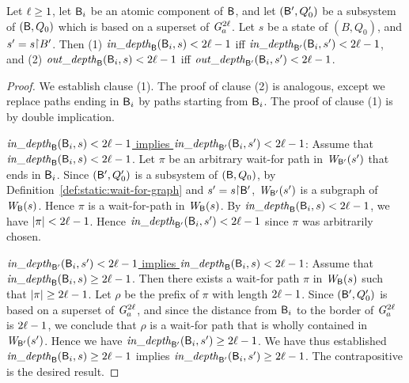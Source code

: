 \begin{proposition} \label{prop:in-out-projection}
Let $\ell \ge 1$, let $\mathsf{B}_i$ be an atomic component of $\mathsf{B}$, and let 
$(\mathsf{B}', Q'_0)$ be a subsystem of $(\mathsf{B}, Q_0)$ which is based on a superset of $\mathit{G}_{a}^{2\ell}$.
Let $s$ be a state of $(B, Q_0)$, and $s' = s \pj B'$. Then
(1) $\mathit{in\_depth}_{\mathsf{B}}({\mathsf{B}_i, s}) < 2\ell-1$ iff $\mathit{in\_depth}_{\mathsf{B}'}({\mathsf{B}_i, s'}) < 2\ell-1$, and
(2) $\mathit{out\_depth}_{\mathsf{B}}({\mathsf{B}_i, s}) < 2\ell-1$ iff $\mathit{out\_depth}_{\mathsf{B}'}({\mathsf{B}_i, s'}) < 2\ell-1$.
\end{proposition}
%
\begin{proof}
We establish clause (1). The proof of clause (2) is analogous, except we replace paths ending in
$\mathsf{B}_i$ by paths starting from $\mathsf{B}_i$.
The proof of clause (1) is by double implication.

\vspace{1.0ex}
\ul{$\mathit{in\_depth}_{\mathsf{B}}({\mathsf{B}_i, s}) < 2\ell-1$ implies $\mathit{in\_depth}_{\mathsf{B}'}({\mathsf{B}_i, s'}) < 2\ell-1$}:
%
Assume that $\mathit{in\_depth}_{\mathsf{B}}({\mathsf{B}_i, s}) < 2\ell-1$.
Let $\pi$ be an arbitrary wait-for path in $\mathit{W}_{\mathsf{B}'}({s'})$ that ends in $\mathsf{B}_i$. 
%
Since $(\mathsf{B}', Q'_0)$ is a subsystem of $(\mathsf{B}, Q_0)$, by Definition~\ref{def:static:wait-for-graph} and $s' = s \pj \B'$,
$\mathit{W}_{\mathsf{B}'}({s'})$ is a subgraph of $\mathit{W}_{\mathsf{B}}({s})$.
%
Hence $\pi$ is a wait-for-path in $\mathit{W}_{\mathsf{B}}({s})$.
By $\mathit{in\_depth}_{\mathsf{B}}({\mathsf{B}_i, s}) < 2\ell-1$, we have $|\pi| < 2\ell-1$. 
Hence $\mathit{in\_depth}_{\mathsf{B}'}({\mathsf{B}_i, s'}) < 2\ell-1$ since $\pi$ was arbitrarily chosen.



\vspace{1.0ex}
\ul{$\mathit{in\_depth}_{\mathsf{B}'}({\mathsf{B}_i, s'}) < 2\ell-1$ implies $\mathit{in\_depth}_{\mathsf{B}}({\mathsf{B}_i, s}) < 2\ell-1$}:
%
Assume that $\mathit{in\_depth}_{\mathsf{B}}({\mathsf{B}_i, s}) \ge 2\ell-1$. Then there exists a wait-for path $\pi$ in $\mathit{W}_{\mathsf{B}}({s})$ such that 
$|\pi| \ge 2\ell-1$. Let $\rho$ be the prefix of $\pi$ with length $2\ell-1$. 
%
Since $(\mathsf{B}', Q'_0)$ is based on a superset of $\mathit{G}_{a}^{2\ell}$, and since the distance from $\mathsf{B}_i$ to the border of 
$\mathit{G}_{a}^{2\ell}$ is $2\ell-1$, we conclude that $\rho$ is a wait-for path
that is wholly contained in $\mathit{W}_{\mathsf{B}'}({s'})$. Hence we have $\mathit{in\_depth}_{\mathsf{B}'}({\mathsf{B}_i, s'}) \ge 2\ell-1$.
%
We have thus established 
$\mathit{in\_depth}_{\mathsf{B}}({\mathsf{B}_i, s}) \ge 2\ell-1$ implies $\mathit{in\_depth}_{\mathsf{B}'}({\mathsf{B}_i, s'}) \ge 2\ell-1$.
The contrapositive is the desired result.
\end{proof}





\vspace{0.5ex}

